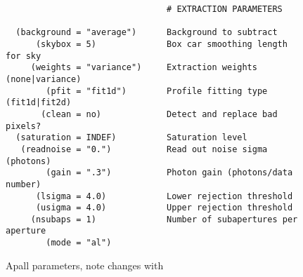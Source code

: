 \begin{figure}
{\begin{verbatim}
                                # EXTRACTION PARAMETERS
                                
  (background = "average")      Background to subtract
      (skybox = 5)              Box car smoothing length for sky
     (weights = "variance")     Extraction weights (none|variance)
        (pfit = "fit1d")        Profile fitting type (fit1d|fit2d)
       (clean = no)             Detect and replace bad pixels?
  (saturation = INDEF)          Saturation level
   (readnoise = "0.")           Read out noise sigma (photons)
        (gain = ".3")           Photon gain (photons/data number)
      (lsigma = 4.0)            Lower rejection threshold
      (usigma = 4.0)            Upper rejection threshold
     (nsubaps = 1)              Number of subapertures per aperture
        (mode = "al")           
\end{verbatim}
}
\endgroup
\caption[Apall parameters]{Apall parameters, note changes with}
\label{fig:ApallParameters}
\end{figure}
